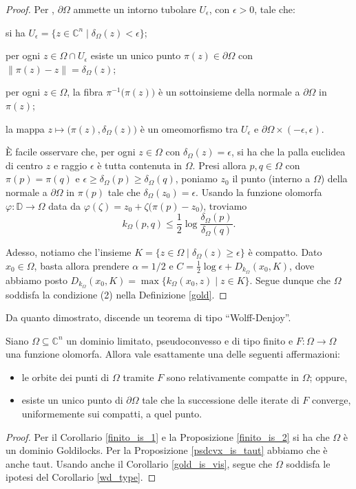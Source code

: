 \begin{proof}
    Per \cite[Chapter 9, Theorem 20]{Sp}, $\partial\Omega$ ammette un intorno tubolare $U_\epsilon$, con $\epsilon>0$, tale che:
    \begin{nlist}
        \item si ha $U_\epsilon=\{z\in\mathbb{C}^n\mid\delta_\Omega(z)<\epsilon\}$;
        \item per ogni $z\in\Omega\cap U_\epsilon$ esiste un unico punto $\pi(z)\in\partial\Omega$ con $\|\pi(z)-z\|=\delta_\Omega(z)$;
        \item per ogni $z\in\Omega$, la fibra $\pi^{-1}\big(\pi(z)\big)$ è un sottoinsieme della normale a $\partial\Omega$ in $\pi(z)$;
        \item la mappa $z\longmapsto\big(\pi(z),\delta_\Omega(z)\big)$ è un omeomorfismo tra $U_\epsilon$ e $\partial\Omega\times(-\epsilon,\epsilon)$.
    \end{nlist}
    È facile osservare che, per ogni $z\in\Omega$ con $\delta_\Omega(z)=\epsilon$, si ha che la palla euclidea di centro $z$ e raggio $\epsilon$ è tutta contenuta in $\Omega$. Presi allora $p,q\in\Omega$ con $\pi(p)=\pi(q)$ e $\epsilon\ge\delta_\Omega(p)\ge\delta_\Omega(q)$, poniamo $z_0$ il punto (interno a $\Omega$) della normale a $\partial\Omega$ in $\pi(p)$ tale che $\delta_\Omega(z_0)=\epsilon$. Usando la funzione olomorfa $\varphi:\mathbb{D}\longrightarrow\Omega$ data da $\varphi(\zeta)=z_0+\zeta\big(\pi(p)-z_0\big)$, troviamo
    $$k_\Omega(p,q) \le \dfrac{1}{2}\log{\dfrac{\delta_\Omega(p)}{\delta_\Omega(q)}}.$$

    Adesso, notiamo che l'insieme $K=\{z\in\Omega\mid\delta_\Omega(z)\ge\epsilon\}$ è compatto. Dato $x_0\in\Omega$, basta allora prendere $\alpha=1/2$ e $C=\frac{1}{2}\log{\epsilon}+D_{k_{\Omega}}(x_0,K)$, dove abbiamo posto $D_{k_\Omega}(x_0,K)=\max\{k_\Omega(x_0,z)\mid z\in K\}$. Segue dunque che $\Omega$ soddisfa la condizione (2) nella Definizione \ref{gold}.
\end{proof}

Da quanto dimostrato, discende un teorema di tipo ``Wolff-Denjoy''.
\begin{cor}
    Siano $\Omega\subseteq\mathbb{C}^n$ un dominio limitato, pseudoconvesso e di tipo finito e $F:\Omega \longrightarrow \Omega$ una funzione olomorfa. Allora vale esattamente una delle seguenti affermazioni:
    \begin{itemize}
        \item le orbite dei punti di $\Omega$ tramite $F$ sono relativamente compatte in $\Omega$; oppure,
        \item esiste un unico punto di $\partial \Omega$ tale che la successione delle iterate di $F$ converge, uniformemente sui compatti, a quel punto.
    \end{itemize}
\end{cor}

\begin{proof}
    Per il Corollario \ref{finito_is_1} e la Proposizione \ref{finito_is_2} si ha che $\Omega$ è un dominio Goldilocks. Per la Proposizione \ref{psdcvx_is_taut} abbiamo che è anche taut. Usando anche il Corollario \ref{gold_is_vis}, segue che $\Omega$ soddisfa le ipotesi del Corollario \ref{wd_type}.
\end{proof}